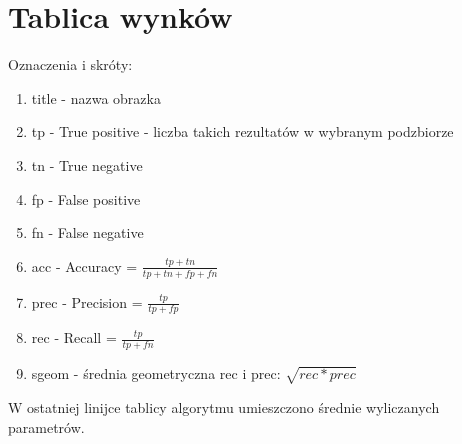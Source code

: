 \documentclass[12pt]{article}
\begin{document}
\section{Tablica wynków}
Oznaczenia i skróty:
\begin{enumerate}
	\item title - nazwa obrazka
	\item tp - True positive - liczba takich rezultatów w wybranym podzbiorze
	\item tn - True negative
	\item fp - False positive
	\item fn - False negative
	\item acc - Accuracy = \(\frac{tp+tn}{tp+tn+fp+fn}\)
	\item prec - Precision = \(\frac{tp}{tp+fp}\)
	\item rec - Recall = \(\frac{tp}{tp+fn}\)
	\item sgeom - średnia geometryczna rec i prec: \(\sqrt{rec*prec}\)
\end{enumerate}
W ostatniej linijce tablicy algorytmu umieszczono średnie wyliczanych parametrów.
\end{document}
